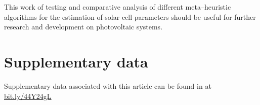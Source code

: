 \documentclass[a4paper,fleqn]{cas-dc}
\begin{document}

This work of testing and comparative analysis of
different meta--heuristic algorithms for the estimation
of solar cell parameters should be useful for further research and development on photovoltaic systems.


\section*{Supplementary data}
Supplementary data associated with this article
can be found in at
\url{bit.ly/44Y24gL}





%


\end{document}
